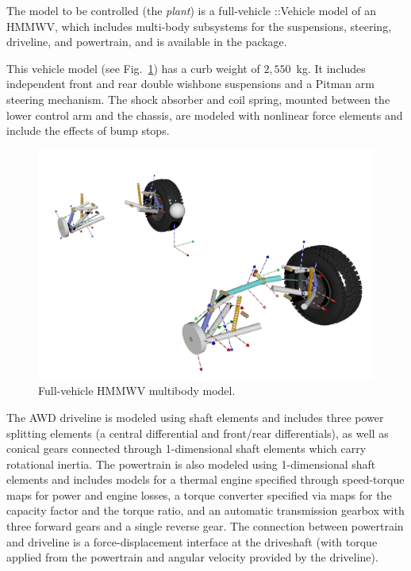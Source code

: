 \documentclass[12pt,onecolumn]{report}
\newcommand{\CHRONO}{{\sffamily{{Chrono}}}}
\newcommand{\ChronoVehicle}{{\sffamily{Chrono}}::Vehicle}
\begin{document}
The model to be controlled (the {\em plant}) is a full-vehicle {\ChronoVehicle} model of an HMMWV, which includes multi-body subsystems for the suspensions, steering, driveline, and powertrain, and is available in the {\CHRONO} package.

This vehicle model (see Fig.~\ref{fig:hmmwv}) has a curb weight of $2,550$~kg.
%
It includes independent front and rear double wishbone suspensions and a Pitman arm steering mechanism. The shock absorber and coil spring, mounted between the lower control arm and the chassis, are modeled with {\CHRONO} nonlinear force elements and include the effects of bump stops.
%
\begin{figure}
	\centering
	\includegraphics[width=\columnwidth]{Figs/hmmwv_bodies.png}
	\caption{\small Full-vehicle HMMWV multibody model.}  
	\label{fig:hmmwv}
\end{figure}

The AWD driveline is modeled using {\CHRONO} shaft elements and includes three power splitting elements (a central differential and front/rear differentials), as well as conical gears connected through 1-dimensional shaft elements which carry rotational inertia. 
%
The powertrain is also modeled using 1-dimensional shaft elements and includes models for a thermal engine specified through speed-torque maps for power and engine losses, a torque converter specified via maps for the capacity factor and the torque ratio, and an automatic transmission gearbox with three forward gears and a single reverse gear.
%
The connection between powertrain and driveline is a force-displacement interface at the driveshaft (with torque applied from the powertrain and angular velocity provided by the driveline).
\end{document}
